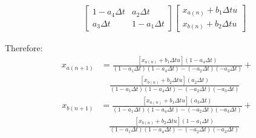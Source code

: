 \documentclass[11pt]{article}
\begin{document}
\begin{subequations}
\begin{align}
    &\quad
    \begin{bmatrix}
      1 - a_4\Delta t & a_2\Delta t \\
      a_3\Delta t & 1 - a_1\Delta t
    \end{bmatrix}
    \begin{bmatrix}
      x_{a(n)} + b_1\Delta t u \\
      x_{b(n)} + b_2\Delta t u
    \end{bmatrix}
  \end{align}
\end{subequations}

Therefore:
\begin{subequations}
  \begin{align}
    x_{a(n+1)} &= \frac{\left[x_{a(n)} + b_1\Delta t u\right](1 - a_4\Delta t)}{(1 - a_1\Delta t)(1 - a_4\Delta t) - (- a_2\Delta t)(- a_3\Delta t)} + \\ \nonumber
    &\quad \frac{\left[x_{b(n)} + b_2\Delta t u\right](a_2\Delta t)}{(1 - a_1\Delta t)(1 - a_4\Delta t) - (- a_2\Delta t)(- a_3\Delta t)}
  \end{align}
\end{subequations}
\begin{subequations}
  \begin{align}
    x_{b(n+1)} &= \frac{\left[x_{a(n)} + b_1\Delta t u\right](a_3\Delta t)}{(1 - a_1\Delta t)(1 - a_4\Delta t) - (- a_2\Delta t)(- a_3\Delta t)} + \\ \nonumber
    &\quad \frac{\left[x_{b(n)} + b_2\Delta t u\right](1 - a_1\Delta t)}{(1 - a_1\Delta t)(1 - a_4\Delta t) - (- a_2\Delta t)(- a_3\Delta t)}
  \end{align}
\end{subequations}
\end{document}
